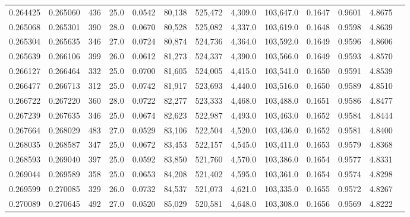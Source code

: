 \begin{tabular}{rrrrrrrrrrrrr}
0.264425 & 0.265060 &   436 & 25.0 &                                     0.0542 &  80,138 & 525,472 &   4,309.0 & 103,647.0 & 0.1647 & 0.9601 & 4.8675 \\
0.265068 & 0.265301 &   390 & 28.0 &                                     0.0670 &  80,528 & 525,082 &   4,337.0 & 103,619.0 & 0.1648 & 0.9598 & 4.8639 \\
0.265304 & 0.265635 &   346 & 27.0 &                                     0.0724 &  80,874 & 524,736 &   4,364.0 & 103,592.0 & 0.1649 & 0.9596 & 4.8606 \\
0.265639 & 0.266106 &   399 & 26.0 &                                     0.0612 &  81,273 & 524,337 &   4,390.0 & 103,566.0 & 0.1649 & 0.9593 & 4.8570 \\
0.266127 & 0.266464 &   332 & 25.0 &                                     0.0700 &  81,605 & 524,005 &   4,415.0 & 103,541.0 & 0.1650 & 0.9591 & 4.8539 \\
0.266477 & 0.266713 &   312 & 25.0 &                                     0.0742 &  81,917 & 523,693 &   4,440.0 & 103,516.0 & 0.1650 & 0.9589 & 4.8510 \\
0.266722 & 0.267220 &   360 & 28.0 &                                     0.0722 &  82,277 & 523,333 &   4,468.0 & 103,488.0 & 0.1651 & 0.9586 & 4.8477 \\
0.267239 & 0.267635 &   346 & 25.0 &                                     0.0674 &  82,623 & 522,987 &   4,493.0 & 103,463.0 & 0.1652 & 0.9584 & 4.8444 \\
0.267664 & 0.268029 &   483 & 27.0 &                                     0.0529 &  83,106 & 522,504 &   4,520.0 & 103,436.0 & 0.1652 & 0.9581 & 4.8400 \\
0.268035 & 0.268587 &   347 & 25.0 &                                     0.0672 &  83,453 & 522,157 &   4,545.0 & 103,411.0 & 0.1653 & 0.9579 & 4.8368 \\
0.268593 & 0.269040 &   397 & 25.0 &                                     0.0592 &  83,850 & 521,760 &   4,570.0 & 103,386.0 & 0.1654 & 0.9577 & 4.8331 \\
0.269044 & 0.269589 &   358 & 25.0 &                                     0.0653 &  84,208 & 521,402 &   4,595.0 & 103,361.0 & 0.1654 & 0.9574 & 4.8298 \\
0.269599 & 0.270085 &   329 & 26.0 &                                     0.0732 &  84,537 & 521,073 &   4,621.0 & 103,335.0 & 0.1655 & 0.9572 & 4.8267 \\
0.270089 & 0.270645 &   492 & 27.0 &                                     0.0520 &  85,029 & 520,581 &   4,648.0 & 103,308.0 & 0.1656 & 0.9569 & 4.8222 \\

\end{tabular}
